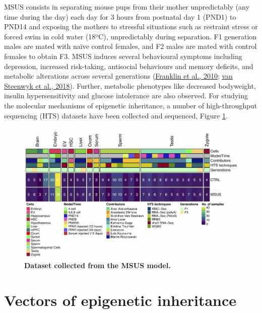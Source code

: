 \documentclass[12pt,twoside]{reedthesis}
\begin{document}
MSUS consists in separating
mouse pups from their mother unpredictably (any time during the day)
each day for 3 hours from postnatal day 1 (PND1) to PND14 and exposing the mothers to stressful situations such as restraint stress or
forced swim in cold water (18ºC), unpredictably during separation. F1 generation males are mated with naïve control females, and F2
males are mated with control females to obtain F3. MSUS induces several
behavioural symptoms including depression, increased risk-taking,
antisocial behaviours and memory deficits, and metabolic alterations
across several generations (\protect\hyperlink{ref-franklin2010}{Franklin et al., 2010}; \protect\hyperlink{ref-vansteenwyk2018}{van Steenwyk et al., 2018}). Further,
metabolic phenotypes like decreased bodyweight, insulin hypersensitivity
and glucose intolerance are also observed. For studying the molecular
mechanisms of epigenetic inheritance, a number of high-throughput sequencing (HTS) datasets have been
collected and sequenced, Figure \ref{fig:if5}.


\begin{figure}[htbp]

{\centering \includegraphics{thesis_files/figure-latex/if5-1} 

}

\caption[Dataset collected from the MSUS model]{\textbf{Dataset collected from the MSUS model.}}\label{fig:if5}
\end{figure}
\hypertarget{vectors-of-epigenetic-inheritance}{%
\section*{Vectors of epigenetic inheritance}\label{vectors-of-epigenetic-inheritance}}
\end{document}
